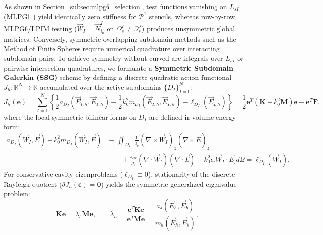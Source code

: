 \documentclass[VANCOUVER,Times1COL]{WileyNJD-v5}
\begin{document}
As shown in Section~\ref{subsec:mlpg6_selection}, test functions vanishing on $L_{sI}$ (MLPG1 \cite{atluri1998new, atluri2002meshless}) yield identically zero stiffness for $\mathcal{P}^1$ stencils, whereas row-by-row MLPG6/LPIM testing ($\vec{W}_I = \vec{N}_{i_0}^I$ on $\Omega_s^I \ne \Omega_s^J$) \cite{liu2001local, nicomedes2012meshless} produces unsymmetric global matrices. Conversely, symmetric overlapping-subdomain methods such as the Method of Finite Spheres \cite{de2000method, nicomedes2017meshfree, nicomedes2021acoustic} require numerical quadrature over interacting subdomain pairs. To achieve symmetry without curved arc integrals over $L_{sI}$ or pairwise intersection quadratures, we formulate a \textbf{Symmetric Subdomain Galerkin (SSG)} scheme by defining a discrete quadratic action functional $J_h: \mathbb{R}^N \to \mathbb{R}$ accumulated over the active subdomains $\{D_I\}_{I=1}^N$:
\begin{equation}
    J_h(\mathbf{e}) = \sum_{I=1}^N \left\{ \frac{1}{2} a_{D_I}(\vec{E}_{I,h}, \vec{E}_{I,h}) - \frac{1}{2} k_0^2 m_{D_I}(\vec{E}_{I,h}, \vec{E}_{I,h}) - \ell_{D_I}(\vec{E}_{I,h}) \right\} = \frac{1}{2} \mathbf{e}^T (\mathbf{K} - k_0^2 \mathbf{M}) \mathbf{e} - \mathbf{e}^T \mathbf{F},
    \label{eq:discrete_action_functional}
\end{equation}
where the local symmetric bilinear forms on $D_I$ are defined in volume energy form:
\begin{equation}
    \begin{aligned}
        a_{D_I}(\vec{W}_I, \vec{E}) - k_0^2 m_{D_I}(\vec{W}_I, \vec{E}) & \equiv \iint_{D_I} \bigg[ \frac{1}{\mu_r} (\nabla \times \vec{W}_I)_z (\nabla \times \vec{E})_z \\
                                                                        & \qquad + \frac{s_{\mathrm{div}}}{\mu_r} (\nabla \cdot \vec{W}_I) (\nabla \cdot \vec{E}) - k_0^2 \epsilon_r \vec{W}_I \cdot \vec{E} \bigg] d\Omega = \ell_{D_I}(\vec{W}_I).
    \end{aligned}
    \label{eq:volume_energy_form}
\end{equation}
For conservative cavity eigenproblems ($\ell_{D_I} \equiv 0$), stationarity of the discrete Rayleigh quotient ($\delta J_h(\mathbf{e}) = \mathbf{0}$) yields the symmetric generalized eigenvalue problem:
\begin{equation}
    \mathbf{K} \mathbf{e} = \lambda_h \mathbf{M} \mathbf{e}, \qquad \lambda_h = \frac{\mathbf{e}^T \mathbf{K} \mathbf{e}}{\mathbf{e}^T \mathbf{M} \mathbf{e}} = \frac{a_h(\vec{E}_h, \vec{E}_h)}{m_h(\vec{E}_h, \vec{E}_h)},
    \label{eq:rayleigh_quotient_overlap}
\end{equation}
\end{document}
